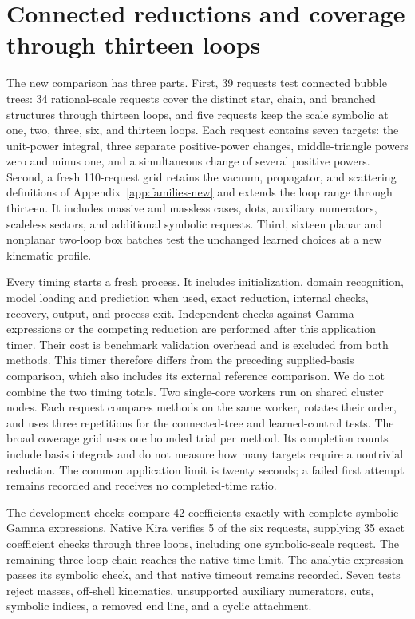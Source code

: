 \section{Connected reductions and coverage through thirteen loops}
\label{sec:loop-tree-results}
The new comparison has three parts. First, 39 requests test connected bubble trees: 34 rational-scale requests cover the distinct star, chain, and branched structures through thirteen loops, and five requests keep the scale symbolic at one, two, three, six, and thirteen loops. Each request contains seven targets: the unit-power integral, three separate positive-power changes, middle-triangle powers zero and minus one, and a simultaneous change of several positive powers. Second, a fresh 110-request grid retains the vacuum, propagator, and scattering definitions of Appendix~\ref{app:families-new} and extends the loop range through thirteen. It includes massive and massless cases, dots, auxiliary numerators, scaleless sectors, and additional symbolic requests. Third, sixteen planar and nonplanar two-loop box batches test the unchanged learned choices at a new kinematic profile.

Every timing starts a fresh process. It includes initialization, domain recognition, model loading and prediction when used, exact reduction, internal checks, recovery, output, and process exit. Independent checks against Gamma expressions or the competing reduction are performed after this application timer. Their cost is benchmark validation overhead and is excluded from both methods. This timer therefore differs from the preceding supplied-basis comparison, which also includes its external reference comparison. We do not combine the two timing totals. Two single-core workers run on shared cluster nodes. Each request compares methods on the same worker, rotates their order, and uses three repetitions for the connected-tree and learned-control tests. The broad coverage grid uses one bounded trial per method. Its completion counts include basis integrals and do not measure how many targets require a nontrivial reduction. The common application limit is twenty seconds; a failed first attempt remains recorded and receives no completed-time ratio.

The development checks compare 42 coefficients exactly with complete symbolic Gamma expressions. Native Kira verifies 5 of the six requests, supplying 35 exact coefficient checks through three loops, including one symbolic-scale request. The remaining three-loop chain reaches the native time limit. The analytic expression passes its symbolic check, and that native timeout remains recorded. Seven tests reject masses, off-shell kinematics, unsupported auxiliary numerators, cuts, symbolic indices, a removed end line, and a cyclic attachment.

